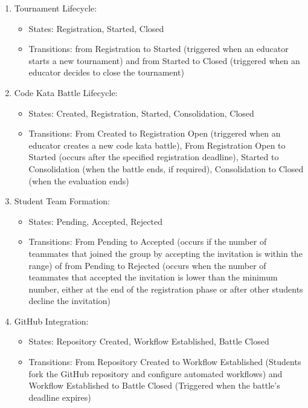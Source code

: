 \begin{enumerate}
    \item Tournament Lifecycle:
        \begin{itemize}
            \item States: Registration, Started, Closed
            \item Transitions: from Registration to Started (triggered when an educator starts a new tournament) and from Started to Closed (triggered when an educator decides to close the tournament)
        \end{itemize}

    \item Code Kata Battle Lifecycle:
        \begin{itemize}
            \item States: Created, Registration, Started, Consolidation, Closed
            \item Transitions: From Created to Registration Open (triggered when an educator creates a new code kata battle), From Registration Open to Started (occurs after the specified registration deadline), Started to Consolidation (when the battle ends, if required), Consolidation to Closed (when the evaluation ends)
        \end{itemize}

    \item Student Team Formation:
        \begin{itemize}
            \item States: Pending, Accepted, Rejected
            \item Transitions: From Pending to Accepted (occurs if the number of teammates that joined the group by accepting the invitation is within the range) of from Pending to Rejected (occurs when the number of teammates that accepted the invitation is lower than the minimum number, either at the end of the registration phase or after other students decline the invitation)
        \end{itemize}

    \item GitHub Integration:
        \begin{itemize}
            \item States: Repository Created, Workflow Established, Battle Closed
            \item Transitions: From Repository Created to Workflow Established (Students fork the GitHub repository and configure automated workflows) and Workflow Established to Battle Closed (Triggered when the battle's deadline expires)
        \end{itemize}


\end{enumerate}
